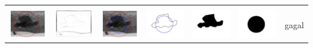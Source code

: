 \begin{table}[H]
\begin{tabular}{|m{0.7in}|m{0.7in}|m{0.7in}|m{0.7in}|m{0.7in}|m{0.7in}|m{0.7in}|}
		&  &  & & & &  \\
		\includegraphics[width=0.7in]{dataset/dataset_3/luka_merah/ready/23_integer_init.jpg}&
		\includegraphics[width=0.7in]{dataset/dataset_3/luka_merah/ready/23_integer_ext.jpg}&
		\includegraphics[width=0.7in]{dataset/dataset_3/luka_merah/ready/23_integer_result.jpg}&
		\includegraphics[width=0.7in]{dataset/dataset_3/luka_merah/ready/23_gt_r_integer.jpg}&
		\includegraphics[width=0.7in]{dataset/dataset_3/luka_merah/ready/23_r.jpg}&
		\includegraphics[width=0.7in]{dataset/dataset_3/luka_merah/ready/23_integer_r.jpg}&
		gagal\\
		\hline
		

\end{tabular}
\end{table}
